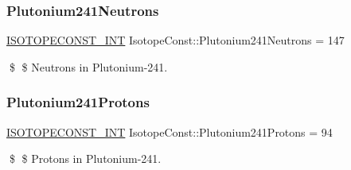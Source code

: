 \subsubsection{\texorpdfstring{Plutonium241\+Neutrons}{Plutonium241Neutrons}}
{\footnotesize\ttfamily \mbox{\hyperlink{group___isotope_const-_macros_ga5f18360b3e99483a35c32d789e62621c}{I\+S\+O\+T\+O\+P\+E\+C\+O\+N\+S\+T\+\_\+\+I\+NT}} Isotope\+Const\+::\+Plutonium241\+Neutrons = 147}

\$ \$ Neutrons in Plutonium-\/241. \mbox{\label{group___isotope_const-_plutonium-_pu241_ga0245d2a185734978bd640f5c510939c2}} 
\subsubsection{\texorpdfstring{Plutonium241\+Protons}{Plutonium241Protons}}
{\footnotesize\ttfamily \mbox{\hyperlink{group___isotope_const-_macros_ga5f18360b3e99483a35c32d789e62621c}{I\+S\+O\+T\+O\+P\+E\+C\+O\+N\+S\+T\+\_\+\+I\+NT}} Isotope\+Const\+::\+Plutonium241\+Protons = 94}

\$ \$ Protons in Plutonium-\/241. 